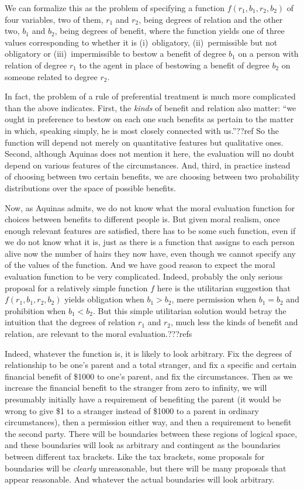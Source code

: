 We can formalize this as the problem of specifying a function $f(r_1,b_1,r_2,b_2)$ of four variables, two of them, $r_1$ and $r_2$, being
degrees of relation and the other two, $b_1$ and $b_2$, being degrees of benefit, where the function yields one of three values
corresponding to whether it is (i)~obligatory, (ii)~permissible but not obligatory or (iii)~impermissible to bestow a benefit of degree $b_1$ on a person with
relation of degree $r_1$ to the agent in place of bestowing a benefit of degree $b_2$ on someone related to degree $r_2$. 

In fact, the problem of a rule of preferential treatment is much more complicated than the above indicates. First, the \textit{kinds} of benefit and relation also matter: ``we ought in preference 
to bestow on each one such benefits as pertain to the matter in which, speaking simply, he is most closely connected with us.''??ref
So the function will depend not merely on quantitative features but qualitative ones. Second, although Aquinas does not mention it here,
the evaluation will no doubt depend on various features of the circumstances. And, third, in practice instead of choosing between
two certain benefits, we are choosing between two probability distributions over the space of possible benefits.

Now, as Aquinas admits, we do not know what the moral evaluation function for choices between benefits to different people is.
But given moral realism, once enough relevant features are satisfied, there has to be some such function, even if we do not know what it is, just as there is a function that assigns to each person
alive now the number of hairs they now have, even though we cannot specify any of the values of the function.
And we have good reason to expect the moral evaluation function to be very complicated. Indeed, probably the only serious proposal for a
relatively simple function $f$ here is the utilitarian suggestion that $f(r_1,b_1,r_2,b_2)$ yields obligation when $b_1>b_2$,
mere permission when $b_1=b_2$ and prohibition when $b_1<b_2$. But this simple utilitarian solution would betray the intuition that
the degrees of relation $r_1$ and $r_2$, much less the kinds of benefit and relation, are relevant to the moral evaluation.???refs

Indeed, whatever the function is, it is likely to look arbitrary. Fix the degrees of relationship to be one's parent and a total stranger,
and fix a specific and certain financial benefit of \$1000 to one's parent, and fix the circumstances. Then as we increase the 
financial benefit to the stranger from zero to infinity, we will presumably initially have a requirement of benefiting the parent
(it would be wrong to give \$1 to a stranger instead of \$1000 to a parent in ordinary circumstances), 
then a permission either way, and then a requirement to benefit the second party. There will be boundaries between these regions
of logical space, and these boundaries will look as arbitrary and contingent as the boundaries between different tax brackets.
Like the tax brackets, some proposals for boundaries will be \textit{clearly} unreasonable, but there will be many proposals
that appear reasonable. And whatever the actual boundaries will look arbitrary.

